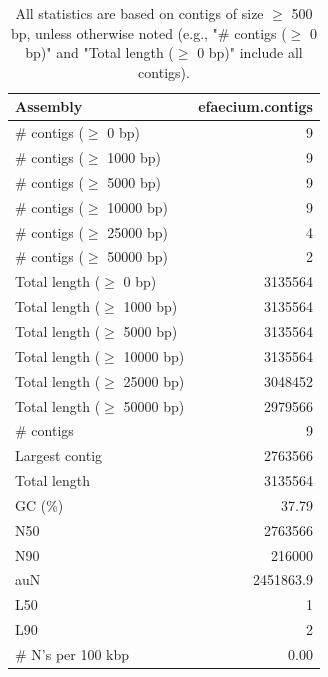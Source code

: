 \documentclass[12pt,a4paper]{article}
\begin{document}
\begin{table}[ht]
\begin{center}
\caption{All statistics are based on contigs of size $\geq$ 500 bp, unless otherwise noted (e.g., "\# contigs ($\geq$ 0 bp)" and "Total length ($\geq$ 0 bp)" include all contigs).}
\begin{tabular}{|l*{1}{|r}|}
\hline
Assembly & efaecium.contigs \\ \hline
\# contigs ($\geq$ 0 bp) & 9 \\ \hline
\# contigs ($\geq$ 1000 bp) & 9 \\ \hline
\# contigs ($\geq$ 5000 bp) & 9 \\ \hline
\# contigs ($\geq$ 10000 bp) & 9 \\ \hline
\# contigs ($\geq$ 25000 bp) & 4 \\ \hline
\# contigs ($\geq$ 50000 bp) & 2 \\ \hline
Total length ($\geq$ 0 bp) & 3135564 \\ \hline
Total length ($\geq$ 1000 bp) & 3135564 \\ \hline
Total length ($\geq$ 5000 bp) & 3135564 \\ \hline
Total length ($\geq$ 10000 bp) & 3135564 \\ \hline
Total length ($\geq$ 25000 bp) & 3048452 \\ \hline
Total length ($\geq$ 50000 bp) & 2979566 \\ \hline
\# contigs & 9 \\ \hline
Largest contig & 2763566 \\ \hline
Total length & 3135564 \\ \hline
GC (\%) & 37.79 \\ \hline
N50 & 2763566 \\ \hline
N90 & 216000 \\ \hline
auN & 2451863.9 \\ \hline
L50 & 1 \\ \hline
L90 & 2 \\ \hline
\# N's per 100 kbp & 0.00 \\ \hline
\end{tabular}
\end{center}
\end{table}
\end{document}
